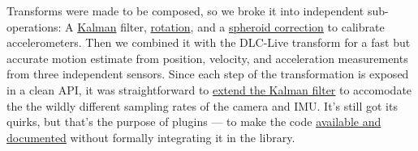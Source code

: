 Transforms were made to be composed, so we broke it into independent sub-operations: A \href{https://docs.auto-pi-lot.com/en/latest/transform/timeseries.html\#autopilot.transform.timeseries.Kalman}{Kalman} filter, \href{https://docs.auto-pi-lot.com/en/latest/transform/geometry.html\#autopilot.transform.geometry.Rotate}{rotation}, and a \href{https://docs.auto-pi-lot.com/en/latest/transform/geometry.html\#autopilot.transform.geometry.Spheroid}{spheroid correction} to calibrate accelerometers. Then we combined it with the DLC-Live transform for a fast but accurate motion estimate from position, velocity, and acceleration measurements from three independent sensors. Since each step of the transformation is exposed in a clean API, it was straightforward to \href{https://github.com/auto-pi-lot/autopilot-plugin-parallax/blob/759dbb382b90a99f71edf5070772ac18555b67dd/kalman\_position.py}{extend the Kalman filter} to accomodate the the wildly different sampling rates of the camera and IMU. It's still got its quirks, but that's the purpose of plugins --- to make the code \href{https://wiki.auto-pi-lot.com/index.php/Plugin:Parallax}{available and documented} without formally integrating it in the library. 

\clearpage

